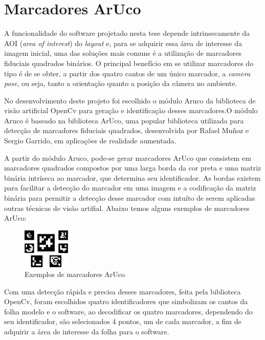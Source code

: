 \documentclass[12pt]{report}
\begin{document}
\chapter{Marcadores ArUco}
\label{cha:cha4}

A funcionalidade do software projetado nesta tese depende intrinsecamente da AOI ({\it area of interest}) do {\it layout} e, para se adquirir essa área de interesse da imagem inicial, uma das soluções mais comuns é a utilização de marcadores fiduciais quadrados binários. O principal benefício em se utilizar marcadores do tipo é de se obter, a partir dos quatro cantos de um único marcador, a {\it camera pose}, ou seja, tanto a orientação quanto a posição da câmera no ambiente.

No desenvolvimento deste projeto foi escolhido o módulo Aruco da biblioteca de visão artificial OpenCv para geração e identificação desses marcadores.O módulo Aruco é baseado na biblioteca ArUco, uma popular biblioteca utilizada para detecção de marcadores fiduciais quadrados, desenvolvida por Rafael Muñoz e Sergio Garrido, em aplicações de realidade aumentada.

A partir do módulo Aruco, pode-se gerar marcadores ArUco que consistem em marcadores quadrados compostos por uma larga borda da cor preta e uma matriz binária intríseca ao marcador, que determina seu identificador. As bordas existem para facilitar a detecção do marcador em uma imagem e a codificação da matriz binária para permitir a detecção desse marcador com intuíto de serem aplicadas outras técnicas de visão artifial. Abaixo temos alguns exemplos de marcadores ArUco:

\begin{figure}[H]
  \centering
    \includegraphics[width=0.2\textwidth]{imagens/markers.jpg}
    \caption{Exemplos de marcadores ArUco}
  \label{fig:arucoMarkers}
\end{figure}

Com uma detecção rápida e precisa desses marcadores, feita pela biblioteca OpenCv, foram escolhidos quatro identificadores que simbolizam os cantos da folha modelo e o software, ao decodificar os quatro marcadores, dependendo do seu identificador, são selecionados 4 pontos, um de cada marcador, a fim de adquirir a área de interesse da folha para o software.
\end{document}
